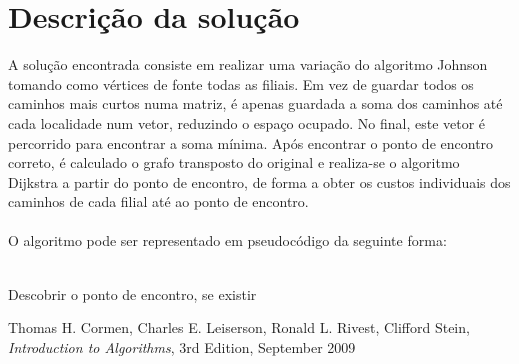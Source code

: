 \documentclass[12pt,a4paper,notitlepage]{article}
\begin{document}
\section{Descrição da solução}
A solução encontrada consiste em realizar uma variação do algoritmo Johnson tomando como vértices de fonte todas as filiais.
Em vez de guardar todos os caminhos mais curtos numa matriz, é apenas guardada a soma dos caminhos até cada localidade num vetor, reduzindo o espaço ocupado.
No final, este vetor é percorrido para encontrar a soma mínima. 
Após encontrar o ponto de encontro correto, é calculado o grafo transposto do original e realiza-se o algoritmo Dijkstra a partir do ponto de encontro, de forma a obter os custos individuais dos caminhos de cada filial até ao ponto de encontro.
\\
\\
O algoritmo pode ser representado em pseudocódigo da seguinte forma:
\\
\\
\begin{algorithm}[H]
    \caption{Descobrir o ponto de encontro, se existir}
\end{algorithm}

\begin{thebibliography}{9}
				Thomas H. Cormen,
				Charles E. Leiserson,
				Ronald L. Rivest,
				Clifford Stein,
				\emph{Introduction to Algorithms},
				3rd Edition,
				September 2009
\end{thebibliography}
\end{document}

